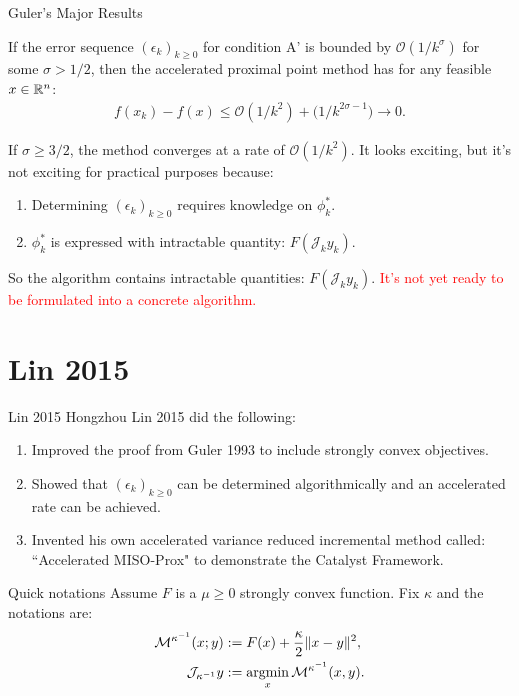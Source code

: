 \documentclass[11pt]{beamer}
\begin{document}
        \begin{frame}{Guler's Major Results}
            \begin{theorem}
                If the error sequence $(\epsilon_k)_{k \ge0}$ for condition A' is bounded by $\mathcal O(1/k^\sigma)$ for some $\sigma > 1/2$, then the accelerated proximal point method has for any feasible $x \in \mathbb R^n$: 
                \begin{align*}
                    f(x_k) - f(x) \le \mathcal O(1/k^2) + \mathcal (1 / k^{2\sigma - 1}) \rightarrow 0. 
                \end{align*}    
            \end{theorem}
            If $\sigma \ge 3/2$, the method converges at a rate of $\mathcal O(1/k^2)$. 
            \pause 
            It looks exciting, but it's not exciting for practical purposes because: 
            \begin{enumerate}
                \item Determining $(\epsilon_k)_{k\ge 0}$ requires knowledge on $\phi_k^*$. 
                \item $\phi_k^*$ is expressed with intractable quantity: $F(\mathcal J_k y_k)$. 
            \end{enumerate}
            So the algorithm contains intractable quantities: $F(\mathcal J_k y_k)$. 
            \textcolor{red}{It's not yet ready to be formulated into a concrete algorithm.}
        \end{frame}
\section{Lin 2015}
    \begin{frame}{Lin 2015}
        Hongzhou Lin 2015 \cite{lin_universal_2015} did the following: 
        \begin{enumerate}
            \item Improved the proof from Guler 1993 to include strongly convex objectives. 
            \item Showed that $(\epsilon_k)_{k\ge 0}$ can be determined algorithmically and  an accelerated rate can be achieved. 
            \item Invented his own accelerated variance reduced incremental method called: ``Accelerated MISO-Prox" to demonstrate the Catalyst Framework. 
        \end{enumerate}
        \begin{block}{Quick notations}
            Assume $F$ is a $\mu \ge 0$ strongly convex function. 
            Fix $\kappa$ and the notations are: 
            \begin{align*}
                \mathcal M^{\kappa^{-1}}(x; y) &:= F(x) + \frac{\kappa}{2}\Vert x - y\Vert^2, 
                \\
                \mathcal J_{\kappa^{-1}} y &:= \mathop{\rm argmin}\limits_x \mathcal M^{\kappa^{-1}} (x, y). 
            \end{align*}
        \end{block}
    \end{frame}
\end{document}
